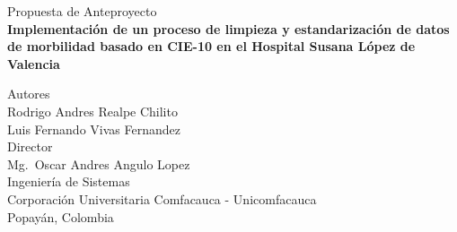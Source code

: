 \documentclass[12pt, letterpaper, oneside]{article}
\begin{document}
\thispagestyle{empty}             %

\begin{center}
  \vspace*{2cm}

  {\normalsize Propuesta de Anteproyecto} \\[0.5cm]

  {\large \textbf{Implementación de un proceso de limpieza y estandarización de datos de morbilidad basado en CIE-10 en el Hospital Susana López de Valencia}} \\[0.5cm]

  \vspace{1.5cm}

  {\normalsize Autores\\Rodrigo Andres Realpe Chilito\\ Luis Fernando Vivas Fernandez} \\[0.3cm]
  {\normalsize Director\\ Mg.\ Oscar Andres Angulo Lopez} \\[0.3cm]
  {\normalsize Ingeniería de Sistemas} \\[0.3cm]
  {\normalsize Corporación Universitaria Comfacauca - Unicomfacauca} \\[0.3cm]
  {\normalsize Popayán, Colombia} \\[0.3cm]
  {\normalsize \the\year}

\end{center}

\newpage


\thispagestyle{empty}
\tableofcontents
\newpage

\setcounter{page}{1}
\end{document}
